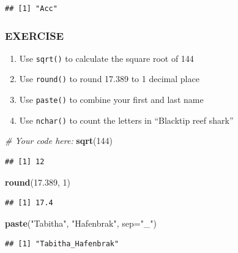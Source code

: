 \documentclass[
]{article}
\newenvironment{Shaded}{\begin{snugshade}}{\end{snugshade}}
\newcommand{\AttributeTok}[1]{\textcolor[rgb]{0.13,0.29,0.53}{#1}}
\newcommand{\CommentTok}[1]{\textcolor[rgb]{0.56,0.35,0.01}{\textit{#1}}}
\newcommand{\DecValTok}[1]{\textcolor[rgb]{0.00,0.00,0.81}{#1}}
\newcommand{\FloatTok}[1]{\textcolor[rgb]{0.00,0.00,0.81}{#1}}
\newcommand{\FunctionTok}[1]{\textcolor[rgb]{0.13,0.29,0.53}{\textbf{#1}}}
\newcommand{\NormalTok}[1]{#1}
\newcommand{\StringTok}[1]{\textcolor[rgb]{0.31,0.60,0.02}{#1}}
\providecommand{\tightlist}{%
  \setlength{\itemsep}{0pt}\setlength{\parskip}{0pt}}
\begin{document}
\begin{verbatim}
## [1] "Acc"
\end{verbatim}

\subsubsection{EXERCISE}\label{exercise-2}

\begin{enumerate}
\def\labelenumi{\arabic{enumi}.}
\tightlist
\item
  Use \texttt{sqrt()} to calculate the square root of 144
\item
  Use \texttt{round()} to round 17.389 to 1 decimal place
\item
  Use \texttt{paste()} to combine your first and last name
\item
  Use \texttt{nchar()} to count the letters in ``Blacktip reef shark''
\end{enumerate}

\begin{Shaded}
\begin{Highlighting}[]
\CommentTok{\# Your code here:}
\FunctionTok{sqrt}\NormalTok{(}\DecValTok{144}\NormalTok{)}
\end{Highlighting}
\end{Shaded}

\begin{verbatim}
## [1] 12
\end{verbatim}

\begin{Shaded}
\begin{Highlighting}[]
\FunctionTok{round}\NormalTok{(}\FloatTok{17.389}\NormalTok{, }\DecValTok{1}\NormalTok{)}
\end{Highlighting}
\end{Shaded}

\begin{verbatim}
## [1] 17.4
\end{verbatim}

\begin{Shaded}
\begin{Highlighting}[]
\FunctionTok{paste}\NormalTok{(}\StringTok{"Tabitha"}\NormalTok{, }\StringTok{"Hafenbrak"}\NormalTok{, }\AttributeTok{sep=}\StringTok{"\_"}\NormalTok{)}
\end{Highlighting}
\end{Shaded}

\begin{verbatim}
## [1] "Tabitha_Hafenbrak"
\end{verbatim}
\end{document}
